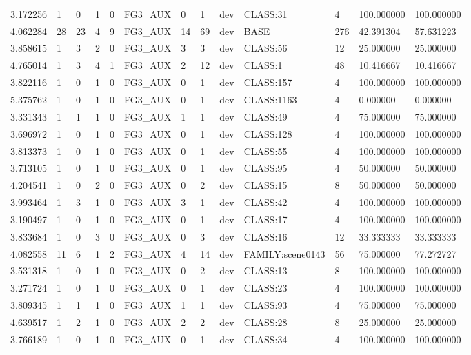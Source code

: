 \begin{tabular}{lllllllllllll}
3.172256 & 1 & 0 & 1 & 0 & FG3\_AUX & 0 & 1 & dev & CLASS:31 & 4 & 100.000000 & 100.000000 \\
4.062284 & 28 & 23 & 4 & 9 & FG3\_AUX & 14 & 69 & dev & BASE & 276 & 42.391304 & 57.631223 \\
3.858615 & 1 & 3 & 2 & 0 & FG3\_AUX & 3 & 3 & dev & CLASS:56 & 12 & 25.000000 & 25.000000 \\
4.765014 & 1 & 3 & 4 & 1 & FG3\_AUX & 2 & 12 & dev & CLASS:1 & 48 & 10.416667 & 10.416667 \\
3.822116 & 1 & 0 & 1 & 0 & FG3\_AUX & 0 & 1 & dev & CLASS:157 & 4 & 100.000000 & 100.000000 \\
5.375762 & 1 & 0 & 1 & 0 & FG3\_AUX & 0 & 1 & dev & CLASS:1163 & 4 & 0.000000 & 0.000000 \\
3.331343 & 1 & 1 & 1 & 0 & FG3\_AUX & 1 & 1 & dev & CLASS:49 & 4 & 75.000000 & 75.000000 \\
3.696972 & 1 & 0 & 1 & 0 & FG3\_AUX & 0 & 1 & dev & CLASS:128 & 4 & 100.000000 & 100.000000 \\
3.813373 & 1 & 0 & 1 & 0 & FG3\_AUX & 0 & 1 & dev & CLASS:55 & 4 & 100.000000 & 100.000000 \\
3.713105 & 1 & 0 & 1 & 0 & FG3\_AUX & 0 & 1 & dev & CLASS:95 & 4 & 50.000000 & 50.000000 \\
4.204541 & 1 & 0 & 2 & 0 & FG3\_AUX & 0 & 2 & dev & CLASS:15 & 8 & 50.000000 & 50.000000 \\
3.993464 & 1 & 3 & 1 & 0 & FG3\_AUX & 3 & 1 & dev & CLASS:42 & 4 & 100.000000 & 100.000000 \\
3.190497 & 1 & 0 & 1 & 0 & FG3\_AUX & 0 & 1 & dev & CLASS:17 & 4 & 100.000000 & 100.000000 \\
3.833684 & 1 & 0 & 3 & 0 & FG3\_AUX & 0 & 3 & dev & CLASS:16 & 12 & 33.333333 & 33.333333 \\
4.082558 & 11 & 6 & 1 & 2 & FG3\_AUX & 4 & 14 & dev & FAMILY:scene0143 & 56 & 75.000000 & 77.272727 \\
3.531318 & 1 & 0 & 1 & 0 & FG3\_AUX & 0 & 2 & dev & CLASS:13 & 8 & 100.000000 & 100.000000 \\
3.271724 & 1 & 0 & 1 & 0 & FG3\_AUX & 0 & 1 & dev & CLASS:23 & 4 & 100.000000 & 100.000000 \\
3.809345 & 1 & 1 & 1 & 0 & FG3\_AUX & 1 & 1 & dev & CLASS:93 & 4 & 75.000000 & 75.000000 \\
4.639517 & 1 & 2 & 1 & 0 & FG3\_AUX & 2 & 2 & dev & CLASS:28 & 8 & 25.000000 & 25.000000 \\
3.766189 & 1 & 0 & 1 & 0 & FG3\_AUX & 0 & 1 & dev & CLASS:34 & 4 & 100.000000 & 100.000000 \\

\end{tabular}

